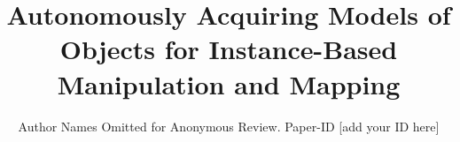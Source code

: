 \documentclass[conference]{IEEEtran}
\newcommand{\mytitle}[0]{Autonomously Acquiring Models of Objects for
  Instance-Based Manipulation and Mapping}
\begin{document}


\title{\mytitle{}}

\author{Author Names Omitted for Anonymous Review. Paper-ID [add your ID here]}

\maketitle


\end{document}
